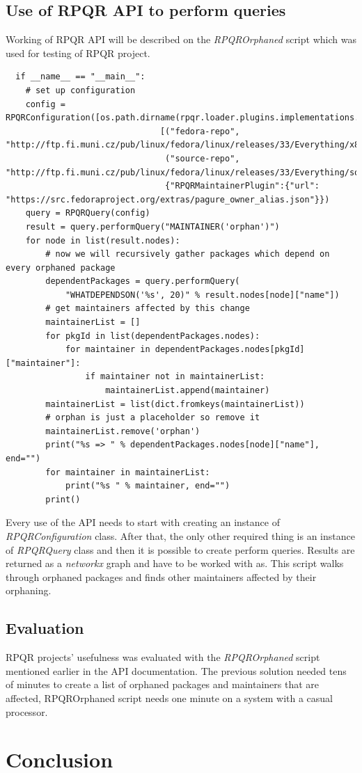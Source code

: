 \section{Use of RPQR API to perform queries}

Working of RPQR API will be described on the \textit{RPQROrphaned} script which was used for testing
of RPQR project.

\begin{lstlisting}
  if __name__ == "__main__":
    # set up configuration
    config = RPQRConfiguration([os.path.dirname(rpqr.loader.plugins.implementations.__file__)],
                               [("fedora-repo", "http://ftp.fi.muni.cz/pub/linux/fedora/linux/releases/33/Everything/x86_64/os/"),
                                ("source-repo", "http://ftp.fi.muni.cz/pub/linux/fedora/linux/releases/33/Everything/source/tree/")],
                                {"RPQRMaintainerPlugin":{"url": "https://src.fedoraproject.org/extras/pagure_owner_alias.json"}})
    query = RPQRQuery(config)
    result = query.performQuery("MAINTAINER('orphan')")
    for node in list(result.nodes):
        # now we will recursively gather packages which depend on every orphaned package
        dependentPackages = query.performQuery(
            "WHATDEPENDSON('%s', 20)" % result.nodes[node]["name"])
        # get maintainers affected by this change
        maintainerList = []
        for pkgId in list(dependentPackages.nodes):
            for maintainer in dependentPackages.nodes[pkgId]["maintainer"]:
                if maintainer not in maintainerList:
                    maintainerList.append(maintainer)
        maintainerList = list(dict.fromkeys(maintainerList))
        # orphan is just a placeholder so remove it
        maintainerList.remove('orphan')
        print("%s => " % dependentPackages.nodes[node]["name"], end="")
        for maintainer in maintainerList:
            print("%s " % maintainer, end="")
        print()
\end{lstlisting}

Every use of the API needs to start with creating an instance of \textit{RPQRConfiguration} class.
After that, the only other required thing is an instance of \textit{RPQRQuery} class and then it is
possible to create perform queries. Results are returned as a \textit{networkx} graph and have to be
worked with as. This script walks through orphaned packages and finds other maintainers affected by
their orphaning. 

\section{Evaluation}

RPQR projects' usefulness was evaluated with the \textit{RPQROrphaned} script mentioned earlier in
the API documentation. The previous solution needed tens of minutes to create a list of orphaned packages
and maintainers that are affected, RPQROrphaned script needs one minute on a system with a casual processor.

\chapter{Conclusion}

\blindtext